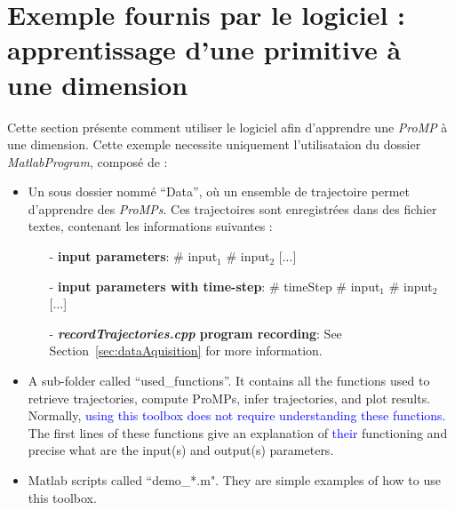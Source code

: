 \documentclass[utf8]{frontiersSCNS} %
\newcommand{\rev}[1]{\textcolor{blue}{#1}}
\begin{document}
\section{Exemple fournis par le logiciel : apprentissage d'une primitive à une dimension}
\label{sec:example1DOF}
Cette section présente comment utiliser le logiciel afin d'apprendre une \textit{ProMP} à une dimension. Cette exemple necessite uniquement l'utilisataion du dossier \textit{MatlabProgram}, composé de :
\begin{itemize}
\item Un sous dossier nommé  ``Data'', où un ensemble de trajectoire permet d'apprendre des \textit{ProMPs}. Ces trajectoires sont enregistrées dans des fichier textes, contenant les informations suivantes :
\begin{itemize}
\item [-] \textbf{input parameters}: \# input$_1$ \# input$_2$ [...]
\item [-] \textbf{input parameters with time-step}: \# timeStep \# input$_1$ \# input$_2$ [...]
\item [-] \textbf{\textit{recordTrajectories.cpp} program recording}: See Section~\ref{sec:dataAquisition} for more information.
\end{itemize}
\item A sub-folder called ``used\_functions''. It contains all the functions used to retrieve trajectories, compute ProMPs, infer trajectories, and plot results. Normally, \rev{using this toolbox does not require understanding these functions. }
The first lines of these functions give an explanation of \rev{their} functioning and precise what are the input(s) and output(s) parameters.
\item Matlab scripts called ``demo\_*.m". They are simple examples of how to use this toolbox.
\end{itemize}
\end{document}
